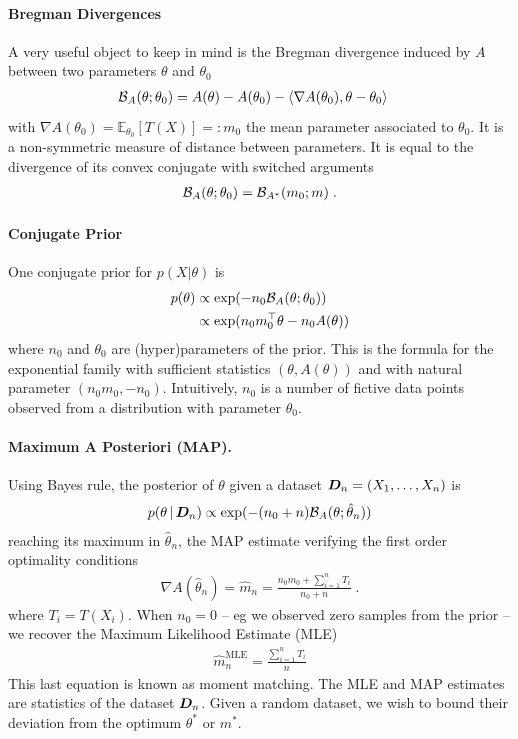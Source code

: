 \documentclass[twoside]{article}
\newcommand*{\expect}[2][]{\ensuremath{\mathbb{E}_{#1} \left[ #2 \right] }} %
\newcommand{\cond}{\,\vert\,}
\newcommand{\logpart}{A}
\newcommand{\bregman}{\cB_\logpart}
\newcommand{\bregmanconj}{\cB_{\logpart^*}}
\newcommand{\nat}{\theta}
\newcommand{\m}{m}
\newcommand{\meanp}{\m}
\newcommand{\MAPm}{\hat \m_n}
\newcommand{\MAPt}{\hat \nat_n}
\begin{document}
\paragraph{Bregman Divergences}
A very useful object to keep in mind is the Bregman divergence induced by $\logpart$ between two parameters $\nat$ and $\nat_0$
\begin{align}
    \bregman (\nat ; \nat_0)
    & = \logpart(\nat) - \logpart(\nat_0) 
    - \langle \nabla \logpart(\nat_0)  , \nat - \nat_0 \rangle
\end{align}
with $\nabla \logpart(\nat_0) = \expect[\nat_0]{T(X)} =: \meanp_0$ the mean parameter associated to $\nat_0$. 
It is a non-symmetric measure of distance between parameters.
It is equal to the divergence of its convex conjugate with switched arguments
\begin{align}
	\bregman (\nat ; \nat_0)
    = \bregmanconj ( \meanp_0 ; \meanp) \; .
\end{align}

\paragraph{Conjugate Prior}
One conjugate prior \citep{agarwal2010geometric} for $p(X|\nat)$ is
\begin{align}
    p(\nat) 
    &\propto \exp( - n_0 \bregman(\nat ; \nat_0) ) \\
    &\propto \exp(n_0 \m_0^\top \nat - n_0 \logpart(\nat))
\end{align}
where $n_0$ and $\nat_0$ are (hyper)parameters of the prior.
This is the formula for the exponential family with sufficient statistics $(\nat ,\logpart(\nat))$ and with natural parameter $(n_0 \m_0, -n_0)$.
Intuitively, $n_0$ is a number of fictive data points observed from a distribution with parameter $\nat_0$.

\paragraph{Maximum A Posteriori (MAP).}
Using Bayes rule, the posterior of $\nat$ given a dataset ${\bm{D}}_n =(X_1,\dots,X_n)$ is
\begin{align}
	p(\nat \cond \mD_n)
    \propto \exp(- (n_0+n) \bregman(\nat; \MAPt))
    \label{eq:joint_likelihood}
\end{align}
reaching its maximum in $\MAPt$, the MAP estimate verifying the first order optimality conditions
\begin{align}
    \nabla \logpart(\MAPt) = \MAPm
    = \frac{n_0 \meanp_0 + \sum_{i=1}^n T_i}{n_0+n} \; .
\end{align}
where $T_i=T(X_i)$.
When $n_0=0$ -- eg we observed zero samples from the prior -- we recover the Maximum Likelihood Estimate (MLE)
\begin{align}
	\hat \m_n^\text{MLE} = \frac{\sum_{i=1}^n T_i}{n}
\end{align}
This last equation is known as moment matching.
The MLE and MAP estimates are statistics of the dataset ${\bm{D}}_n$. 
Given a random dataset, we wish to bound their deviation from the optimum $\nat^*$ or $\meanp^*$.
\end{document}
